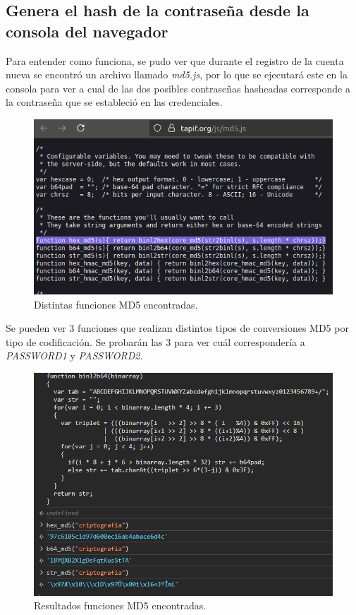 \documentclass[letter,12pt]{article}
\begin{document}
\subsection{Genera el hash de la contraseña desde la consola del navegador}

Para entender como funciona, se pudo ver que durante el registro de la cuenta nueva se encontró un archivo llamado \textit{md5.js}, por lo que se ejecutará este en la consola para ver a cual de las dos posibles contraseñas hasheadas corresponde a la contraseña que se estableció en las credenciales.

\begin{figure}[H]
            \centering
            \includegraphics[width=0.8\linewidth]{funcionesmd5.png}
        \caption{\label{fig:8} Distintas funciones MD5 encontradas. }
    \end{figure}

Se pueden ver 3 funciones que realizan distintos tipos de conversiones MD5 por tipo de codificación. Se probarán las 3 para ver cuál correspondería a \textit{PASSWORD1} y \textit{PASSWORD2}.

\begin{figure}[H]
            \centering
            \includegraphics[width=0.8\linewidth]{resultadofuncionesmd5.png}
        \caption{\label{fig:9} Resultados funciones MD5 encontradas. }
    \end{figure}
\end{document}
